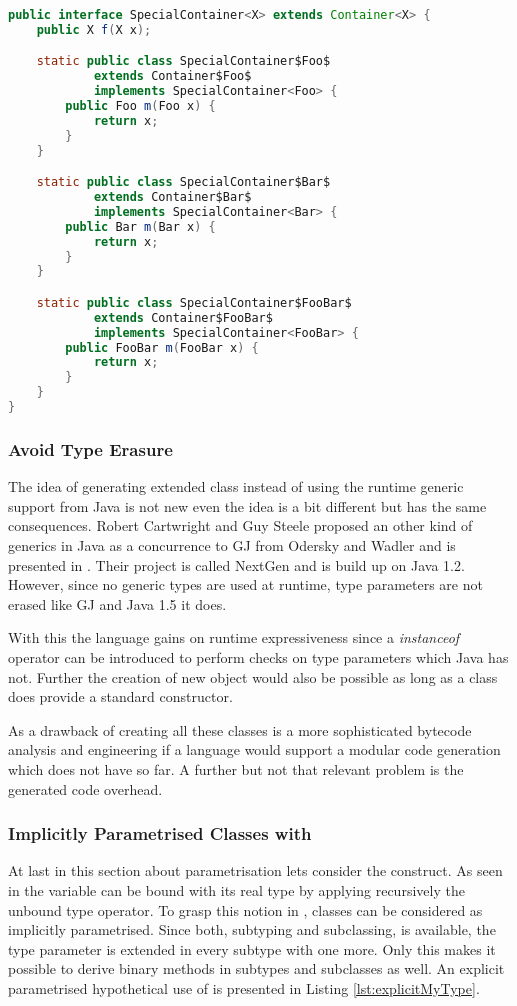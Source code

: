 \begin{lstlisting}[float,language=java,caption=Extending a container class translated to Java,label=lst:extendingContainer]
public interface SpecialContainer<X> extends Container<X> {
	public X f(X x);

	static public class SpecialContainer$Foo$ 
			extends Container$Foo$ 
			implements SpecialContainer<Foo> {
		public Foo m(Foo x) {
			return x;
		}
	}

	static public class SpecialContainer$Bar$ 
			extends Container$Bar$ 
			implements SpecialContainer<Bar> {
		public Bar m(Bar x) {
			return x;
		}
	}

	static public class SpecialContainer$FooBar$ 
			extends Container$FooBar$ 
			implements SpecialContainer<FooBar> {
		public FooBar m(FooBar x) {
			return x;
		}
	}
}
\end{lstlisting}

\subsubsection{Avoid Type Erasure}
The idea of generating extended class instead of using the runtime
generic support from Java is not new even the idea is a bit different
but has the same consequences. Robert Cartwright and Guy Steele proposed
an other kind of generics in Java as a concurrence to GJ from Odersky
and Wadler and is presented in \cite{cartwright_compatible_1998}. Their
project is called NextGen and is build up on Java 1.2. However, since
no generic types are used at runtime, type parameters are not erased
like GJ and Java 1.5 it does.

With this the language gains on runtime expressiveness since a
\emph{instanceof} operator can be introduced to perform checks on type
parameters which Java has not. Further the creation of new object would
also be possible as long as a class does provide a standard constructor.

As a drawback of creating all these classes is a more sophisticated 
bytecode analysis and engineering if a language would support a modular
code generation which \ooplss does not have so far. A further but not 
that relevant problem is the generated code overhead.

\subsubsection{Implicitly Parametrised Classes with \mytype}
At last in this section about parametrisation lets consider the \mytype
construct. As seen in  the \self variable
can be bound with its real type by applying recursively the unbound type
operator. To grasp this notion in \ooplss, classes can be considered
as implicitly parametrised. Since both, subtyping and subclassing, is
available, the type parameter is extended in every subtype with one more.
Only this makes it possible to derive binary methods in subtypes
and subclasses as well. An explicit parametrised hypothetical use of
\mytype is presented in Listing \ref{lst:explicitMyType}.

